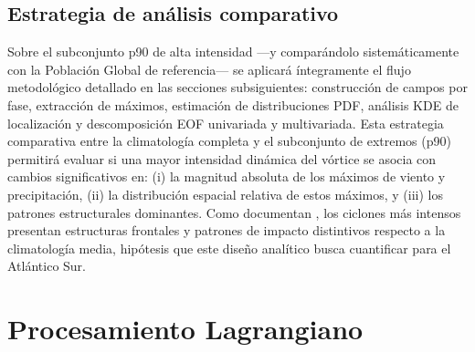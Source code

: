 

\subsection{Estrategia de análisis comparativo}\label{subsec:estrategia_analise}

%
Sobre el subconjunto p90 de alta intensidad —y comparándolo sistemáticamente con la Población Global de referencia— se aplicará íntegramente el flujo metodológico detallado en las secciones subsiguientes: construcción de campos por fase, extracción de máximos, estimación de distribuciones PDF, análisis KDE de localización y descomposición EOF univariada y multivariada. Esta estrategia comparativa entre la climatología completa y el subconjunto de extremos (p90) permitirá evaluar si una mayor intensidad dinámica del vórtice se asocia con cambios significativos en: (i) la magnitud absoluta de los máximos de viento y precipitación, (ii) la distribución espacial relativa de estos máximos, y (iii) los patrones estructurales dominantes. Como documentan \citet{andrade2024composite}, los ciclones más intensos presentan estructuras frontales y patrones de impacto distintivos respecto a la climatología media, hipótesis que este diseño analítico busca cuantificar para el Atlántico Sur.

\section{Procesamiento Lagrangiano}\label{sec:procesamiento_lagrangiano}

